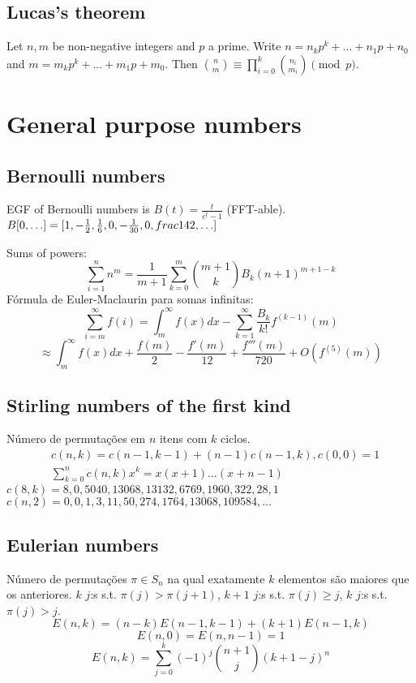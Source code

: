     \subsection{Lucas's theorem}
		Let $n,m$ be non-negative integers and $p$ a prime. Write $n=n_k p^k+...+n_1 p+n_0$ and $m=m_k p^k+...+m_1 p + m_0$. Then $\binom{n}{m} \equiv \prod_{i = 0}^k\binom{n_i}{m_i} \pmod{p}$.


\section{General purpose numbers}
	\subsection{Bernoulli numbers}
		EGF of Bernoulli numbers is $B(t)=\frac{t}{e^t-1}$ (FFT-able).
		$B[0,\ldots] = [1, -\frac{1}{2}, \frac{1}{6}, 0, -\frac{1}{30}, 0, \\frac{1}{42}, \ldots]$

		Sums of powers:
		\small
		\[ \sum_{i=1}^n n^m = \frac{1}{m+1} \sum_{k=0}^m \binom{m+1}{k} B_k (n+1)^{m+1-k} \]
		\normalsize
		Fórmula de Euler-Maclaurin para somas infinitas:
		\small
		\[ \sum_{i=m}^{\infty} f(i) = \int_m^\infty f(x) dx - \sum_{k=1}^\infty \frac{B_k}{k!}f^{(k-1)}(m) \]
		\[ \approx \int_{m}^\infty f(x)dx + \frac{f(m)}{2} - \frac{f'(m)}{12} + \frac{f'''(m)}{720} + O(f^{(5)}(m)) \]
		\normalsize

	\subsection{Stirling numbers of the first kind}
		Número de permutações em $n$ itens com $k$ ciclos.
		\begin{align*}
			&c(n,k) = c(n-1,k-1) + (n-1) c(n-1,k), c(0,0) = 1\\
			&\textstyle \sum_{k=0}^n c(n,k)x^k = x(x+1) \dots (x+n-1)
		\end{align*}
		$c(8,k) = 8, 0, 5040, 13068, 13132, 6769, 1960, 322, 28, 1$ 
		$c(n,2) = 0, 0, 1, 3, 11, 50, 274, 1764, 13068, 109584, \dots$

	\subsection{Eulerian numbers}
		Número de permutações $\pi \in S_n$ na qual exatamente $k$ elementos são maiores que os anteriores. $k$ $j$:s s.t. $\pi(j)>\pi(j+1)$, $k+1$ $j$:s s.t. $\pi(j)\geq j$, $k$ $j$:s s.t. $\pi(j)>j$.
		$$E(n,k) = (n-k)E(n-1,k-1) + (k+1)E(n-1,k)$$
		$$E(n,0) = E(n,n-1) = 1$$
		$$E(n,k) = \sum_{j=0}^k(-1)^j\binom{n+1}{j}(k+1-j)^n$$

